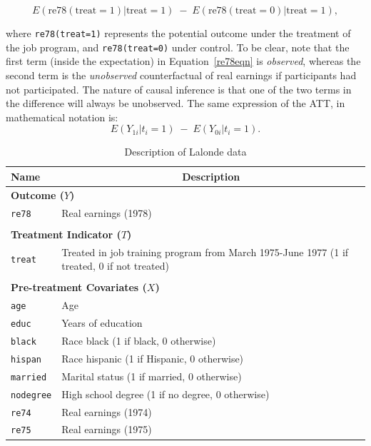 \documentclass[oneside,letterpaper,titlepage]{article}
\begin{document}
\begin{equation}\label{re78eqn}
E(\text{re78}(\text{treat}=1) | \text{treat}=1)\; - \; E(\text{re78}(\text{treat}=0) | \text{treat}=1),
\end{equation}

\noindent where \texttt{re78(treat=1)} represents the potential
outcome under the treatment of the job program, and
\texttt{re78(treat=0)} under control.  To be clear, note that the
first term (inside the expectation) in Equation~\ref{re78eqn} is
\emph{observed}, whereas the second term is the \emph{unobserved}
counterfactual of real earnings if participants had not participated.
The nature of causal inference is that one of the two terms in the
difference will always be unobserved.  The same expression of the ATT,
in mathematical notation is:
\begin{equation}
  E(Y_{1i} | t_i=1 ) \; - \; E(Y_{0i} | t_i=1).
\end{equation}
\begin{table}[h]
\centering
\begin{tabular}{lp{3in}}
  \hline 
  \multicolumn{1}{l}{Name} & \multicolumn{1}{c}{Description} \\
  \hline
  \multicolumn{2}{l}{\textbf{Outcome ($Y$)}} \\ 
  \texttt{re78} & Real earnings (1978) \\\\
  \multicolumn{2}{l}{\textbf{Treatment Indicator ($T$)}} \\
  \texttt{treat} & Treated in job training program from March 1975-June
  1977 (1 if treated, 0 if not treated)
  \\ \\
  \multicolumn{2}{l}{\textbf{Pre-treatment Covariates ($X$)}} \\
  \texttt{age} & Age\\
  \texttt{educ} & Years of education \\
  \texttt{black} & Race black (1 if black, 0 otherwise) \\
  \texttt{hispan} & Race hispanic  (1 if Hispanic, 0 otherwise) \\
  \texttt{married} & Marital status (1 if married, 0 otherwise) \\
  \texttt{nodegree} & High school degree (1 if no degree, 0 otherwise)\\
  \texttt{re74} & Real earnings (1974) \\
  \texttt{re75} & Real earnings (1975) \\ 
  \hline
\end{tabular}\label{lalonde}
\caption{Description of Lalonde data \label{dwvars}}
\end{table}
\end{document}
